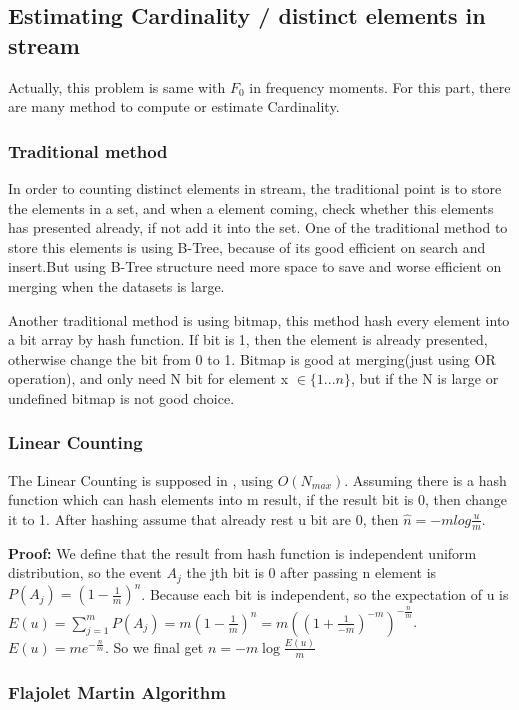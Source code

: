 \documentclass{report}
\begin{document}
\subsection{Estimating Cardinality / distinct elements in stream }

Actually, this problem is same with $F_0$ in frequency moments. For this part, there are many method to compute or estimate Cardinality.

\subsubsection{ Traditional method }
In order to counting distinct elements in stream, the traditional point is to store the elements in a set, and when a element coming, check whether this elements has presented already, if not add it into the set.
One of the traditional method to store this elements is using B-Tree, because of its good efficient on search and insert.But using B-Tree structure need more space to save and worse efficient on merging when the datasets is large.

Another traditional method is using bitmap, this method hash every element into a bit array by hash function. If bit is 1, then the element is already presented, otherwise change the bit from 0 to 1. Bitmap is good at merging(just using OR operation), and only need N bit for element x $\in \{1...n\}$, but if the N is large or undefined bitmap is not good choice.

\subsubsection{Linear Counting}
The Linear Counting is supposed in \citep{whang1990linear}, using $O(N_{max})$.
Assuming there is a hash function which can hash elements into m result, if the result bit is 0, then change it to 1. After hashing assume that already rest u bit are 0, then $\hat{n} = -mlog\frac{u}{m}$.

\textbf{Proof:} We define that the result from hash function is independent uniform distribution, so the event $A_j$ the jth bit is 0 after passing n element is $P(A_j) = (1-\frac{1}{m})^n$. Because each bit is independent, so the expectation of u is $E(u) = \sum_{j=1}^{m} P(A_j) = m(1-\frac{1}{m})^n = m((1+\frac{1}{-m})^{-m})^{-\frac{n}{m}}$. $E(u) = me^{-\frac{n}{m}} $. So we final get $n = -m\log{\frac{E(u)}{m}}$

\subsubsection{ Flajolet Martin Algorithm}
\end{document}
